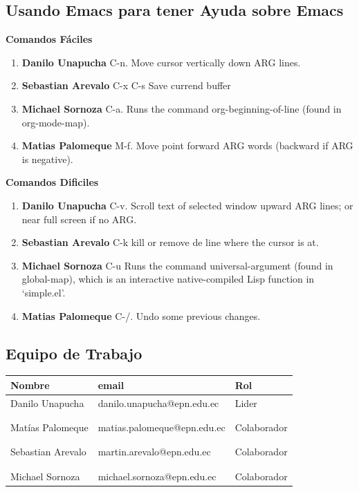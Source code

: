 \documentclass[11pt]{article}
\begin{document}
\subsection{Usando Emacs para tener Ayuda sobre Emacs}
\label{sec:org6e5d45f}
\textbf{\textbf{Comandos Fáciles}}
\begin{enumerate}
\item \textbf{\textbf{Danilo Unapucha}} C-n. Move cursor vertically down ARG lines.
\item \textbf{\textbf{Sebastian Arevalo}} C-x C-s Save currend buffer
\item \textbf{\textbf{Michael Sornoza}} C-a. Runs the command org-beginning-of-line (found in org-mode-map).
\item \textbf{\textbf{Matias Palomeque}} M-f. Move point forward ARG words (backward if ARG is negative).
\end{enumerate}

\textbf{\textbf{Comandos Dificiles}}
\begin{enumerate}
\item \textbf{\textbf{Danilo Unapucha}} C-v. Scroll text of selected window upward ARG lines; or near full screen if no ARG.
\item \textbf{\textbf{Sebastian Arevalo}} C-k kill or remove de line where the cursor is at.
\item \textbf{\textbf{Michael Sornoza}} C-u Runs the command universal-argument (found in global-map), which is an interactive native-compiled Lisp function in ‘simple.el’.
\item \textbf{\textbf{Matias Palomeque}} C-/. Undo some previous changes.
\end{enumerate}
\subsection{Equipo de Trabajo}
\label{sec:org2c35952}
\begin{center}
\begin{tabular}{lll}
Nombre & email & Rol\\[0pt]
\hline
Danilo Unapucha & danilo.unapucha@epn.edu.ec & Lider\\[0pt]
 &  & \\[0pt]
 &  & \\[0pt]
Matías Palomeque & matias.palomeque@epn.edu.ec & Colaborador\\[0pt]
 &  & \\[0pt]
 &  & \\[0pt]
Sebastian Arevalo & martin.arevalo@epn.edu.ec & Colaborador\\[0pt]
 &  & \\[0pt]
 &  & \\[0pt]
Michael Sornoza & michael.sornoza@epn.edu.ec & Colaborador\\[0pt]
\end{tabular}
\end{center}
\end{document}

